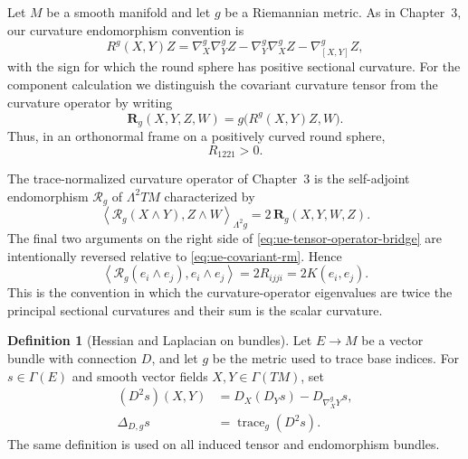 \documentclass[10pt]{coll-l}
\newcommand{\trace}{\operatorname{trace}}
\theoremstyle{definition}
\newtheorem{definition}[theorem]{Definition}
\theoremstyle{remark}
\numberwithin{section}{chapter}
\numberwithin{equation}{chapter}
\begin{document}
Let $M$ be a smooth manifold and let $g$ be a Riemannian metric.  As in
Chapter~3, our curvature endomorphism convention is
\begin{equation}
 R^g(X,Y)Z
   =\nabla_X^g\nabla_Y^gZ-\nabla_Y^g\nabla_X^gZ
      -\nabla_{[X,Y]}^gZ,                                \label{eq:ue-curvature-sign}
\end{equation}
with the sign for which the round sphere has positive sectional curvature.
For the component calculation we distinguish the covariant curvature tensor
from the curvature operator by writing
\begin{equation}
 \mathbf R_g(X,Y,Z,W)
     =g\bigl(R^g(X,Y)Z,W\bigr).                          \label{eq:ue-covariant-rm}
\end{equation}
Thus, in an orthonormal frame on a positively curved round sphere,
\[
                      R_{1221}>0.
\]

The trace-normalized curvature operator of Chapter~3 is the self-adjoint
endomorphism $\mathcal R_g$ of $\Lambda^2TM$ characterized by
\begin{equation}
 \left\langle
    \mathcal R_g(X\wedge Y),Z\wedge W
 \right\rangle_{\Lambda^2g}
   =2\,\mathbf R_g(X,Y,W,Z).                             \label{eq:ue-tensor-operator-bridge}
\end{equation}
The final two arguments on the right side of
\eqref{eq:ue-tensor-operator-bridge} are intentionally reversed relative to
\eqref{eq:ue-covariant-rm}.  Hence
\[
 \left\langle
   \mathcal R_g(e_i\wedge e_j),e_i\wedge e_j
 \right\rangle=2R_{ijji}=2K(e_i,e_j).
\]
This is the convention in which the curvature-operator eigenvalues are
twice the principal sectional curvatures and their sum is the scalar
curvature.

\begin{definition}[Hessian and Laplacian on bundles]
\label{def:ue-bundle-hessian-laplacian}
Let $E\to M$ be a vector bundle with connection $D$, and let $g$ be the
metric used to trace base indices.  For $s\in\Gamma(E)$ and smooth vector
fields $X,Y\in\Gamma(TM)$, set
\begin{align}
 (D^2s)(X,Y)
   &=D_X(D_Ys)-D_{\nabla_X^gY}s,                         \label{eq:ue-rough-hessian}\\
 \Delta_{D,g}s
   &=\trace_g(D^2s).                                    \label{eq:ue-rough-laplacian}
\end{align}
The same definition is used on all induced tensor and endomorphism bundles.
\end{definition}
\end{document}
